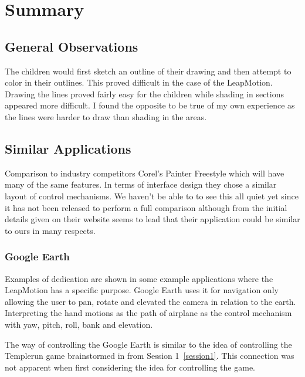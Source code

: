 
\chapter{Summary} %

\label{Chapter5} %



\section{General Observations}
The children would first sketch an outline of their drawing and then attempt to color in their outlines. This proved difficult in the case of the LeapMotion. Drawing the lines proved fairly easy for the children while shading in sections appeared more difficult. I found the opposite to be true of my own experience as the lines were harder to draw than shading in the areas.

\section{Similar Applications}

Comparison to industry competitors Corel's Painter Freestyle which will have many of the same features. In terms of interface design they chose a similar layout of control mechanisms. We haven't be able to to see this all quiet yet since it has not been released to perform a full comparison although from the initial details given on their website seems to lead that their application could be similar to ours in many respects. \cite{corelfreestyle}

\subsection{Google Earth}
Examples of dedication are shown in some example applications where the LeapMotion has a specific purpose. Google Earth uses it for navigation only allowing the user to pan, rotate and elevated the camera in relation to the earth. Interpreting the hand motions as the path of airplane as the control mechanism with yaw, pitch, roll, bank and elevation. 

The way of controlling the Google Earth is similar to the idea of controlling the Templerun game brainstormed in from Session 1~\ref{session1}. This connection was not apparent when first considering the idea for controlling the game. 


